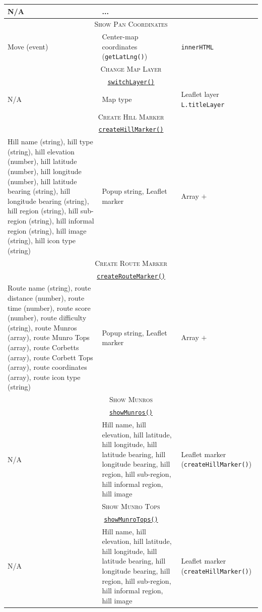 \documentclass[11pt, english]{article}
\begin{document}
\begin{center}
\begin{longtable}{p{4cm}p{6cm}p{2cm}}
		N/A & ... \\
		\hline
		\multicolumn{3}{c}{\textsc{Show Pan Coordinates}}\\
		\hline
		Move (event) & Center-map coordinates (\texttt{getLatLng()}) & \texttt{innerHTML}\\
		\hline
		\multicolumn{3}{c}{\textsc{Change Map Layer}}\\
		\hline
		\multicolumn{3}{c}{\underline{\texttt{switchLayer()}}}\\
		N/A & Map type & Leaflet layer \texttt{L.titleLayer}\\
		\hline
		\multicolumn{3}{c}{\textsc{Create Hill Marker}}\\
		\hline
		\multicolumn{3}{c}{\underline{\texttt{createHillMarker()}}}\\
		Hill name (string), hill type (string), hill elevation (number), hill latitude (number), hill longitude (number), hill latitude bearing (string), hill longitude bearing (string), hill region (string), hill sub-region (string), hill informal region (string), hill image (string), hill icon type (string) & Popup string, Leaflet marker & Array $+$\\
		\hline
		\multicolumn{3}{c}{\textsc{Create Route Marker}}\\
		\hline
		\multicolumn{3}{c}{\underline{\texttt{createRouteMarker()}}}\\
		Route name (string), route distance (number), route time (number), route score (number), route difficulty (string), route Munros (array), route Munro Tops (array), route Corbetts (array), route Corbett Tops (array), route coordinates (array), route icon type (string) & Popup string, Leaflet marker & Array $+$\\
		\hline
		\multicolumn{3}{c}{\textsc{Show Munros}}\\
		\hline
		\multicolumn{3}{c}{\underline{\texttt{showMunros()}}}\\
		N/A & Hill name, hill elevation, hill latitude, hill longitude, hill latitude bearing, hill longitude bearing, hill region, hill sub-region, hill informal region, hill image & Leaflet marker (\texttt{createHillMarker()})\\
		\hline
		\multicolumn{3}{c}{\textsc{Show Munro Tops}}\\
		\hline
		\multicolumn{3}{c}{\underline{\texttt{showMunroTops()}}}\\
		N/A & Hill name, hill elevation, hill latitude, hill longitude, hill latitude bearing, hill longitude bearing, hill region, hill sub-region, hill informal region, hill image & Leaflet marker (\texttt{createHillMarker()})\\

\end{longtable}
\end{center}
\end{document}
